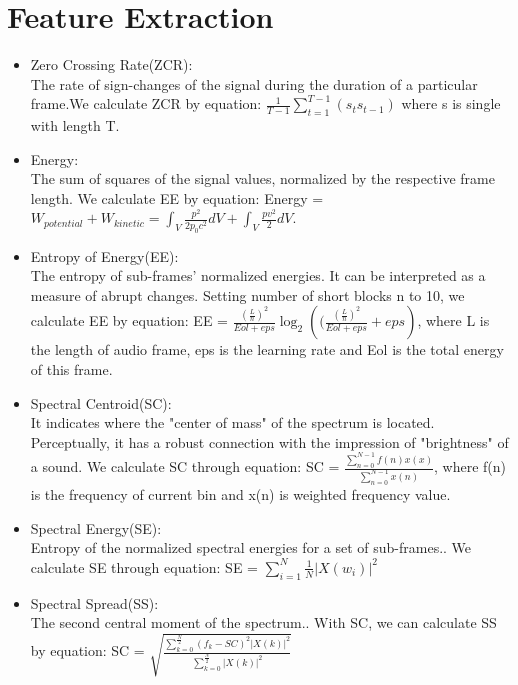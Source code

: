 \section{Feature Extraction}
\begin{itemize}
	\item Zero Crossing Rate(ZCR):\\
	The rate of sign-changes of the signal during the duration of a particular frame.\cite{b1}We calculate ZCR by equation: $\frac{1}{T-1}\sum_{t = 1}^{T - 1}(s_t s_{t-1})$ where s is single with length T.\\
	\item Energy:\\
	The sum of squares of the signal values, normalized by the respective frame length.\cite{b2} We calculate EE by equation: Energy = $W_{potential} + W_{kinetic} = \int_{V}^{} \frac{p^2}{2p_0c^2} dV + \int_{V}^{} \frac{pv^2}{2}dV$.\\
	\item Entropy of Energy(EE):\\
	The entropy of sub-frames' normalized energies. It can be interpreted as a measure of abrupt changes.\cite{b2} Setting number of short blocks n to 10, we calculate EE by equation: EE = $\frac{(\frac{L}{n})^2}{Eol +eps} \log_{2}({(\frac{(\frac{L}{n})^2}{Eol +eps} + eps})$, where L is the length of audio frame, eps is the learning rate and Eol is the total energy of this frame.\\
	\item Spectral Centroid(SC):\\
	It indicates where the "center of mass" of the spectrum is located. Perceptually, it has a robust connection with the impression of "brightness" of a sound.\cite{b3} We calculate SC through equation: SC = $\frac{\sum_{n = 0}^{N - 1} f(n)x(x)}{\sum_{n = 0}^{N - 1} x(n)}$, where f(n) is the frequency of current bin and x(n) is weighted frequency value.\\
	\item Spectral Energy(SE):\cite{b1}\\
	Entropy of the normalized spectral energies for a set of sub-frames.\cite{b3}. We calculate SE through equation: SE = $\sum_{i = 1}^{N} \frac{1}{N} |X(w_i)|^2$ \\
	\item Spectral Spread(SS):\\
	The second central moment of the spectrum.\cite{b3}. With SC, we can calculate SS by equation: SC = $\sqrt{\frac{\sum_{k = 0}^{\frac{N}{2}} (f_k-SC)^2 |X(k)|^2}{\sum_{k = 0}^{\frac{N}{2}} |X(k)|^2 }}$\\

\end{itemize}
